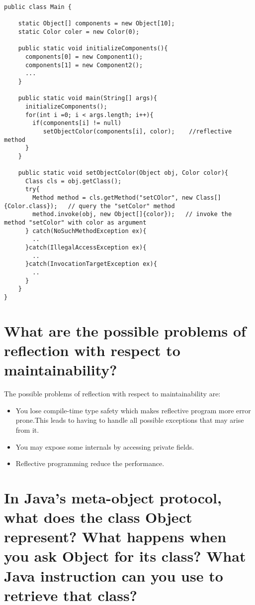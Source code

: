 \begin{lstlisting}[caption=reflective program]
public class Main {

    static Object[] components = new Object[10];
    static Color coler = new Color(0);
    
    public static void initializeComponents(){
      components[0] = new Component1();
      components[1] = new Component2();
      ...
    }
    
    public static void main(String[] args){
      initializeComponents();
      for(int i =0; i < args.length; i++){
        if(components[i] != null)
           setObjectColor(components[i], color);    //reflective method
      }
    }
    
    public static void setObjectColor(Object obj, Color color){
      Class cls = obj.getClass();
      try{
        Method method = cls.getMethod("setCOlor", new Class[]{Color.class});   // query the "setColor" method
        method.invoke(obj, new Object[]{color});   // invoke the method "setColor" with color as argument
      } catch(NoSuchMethodException ex){ 
        ..
      }catch(IllegalAccessException ex){
        ..
      }catch(InvocationTargetException ex){
        ..
      }
    }
}
\end{lstlisting}

\section{What are the possible problems of reflection with respect to maintainability?}

The possible problems of reflection with respect to maintainability are:
\begin{itemize}
\item You lose compile-time type safety which makes reflective program more error prone.This leads to having to handle all possible exceptions that may arise from it.
\item You may expose some internals by accessing private fields.
\item Reflective programming reduce the performance.
\end{itemize}


\section{In Java’s meta-object protocol, what does the class Object represent?
What happens when you ask Object for its class?
What Java instruction can you use to retrieve that class?}

